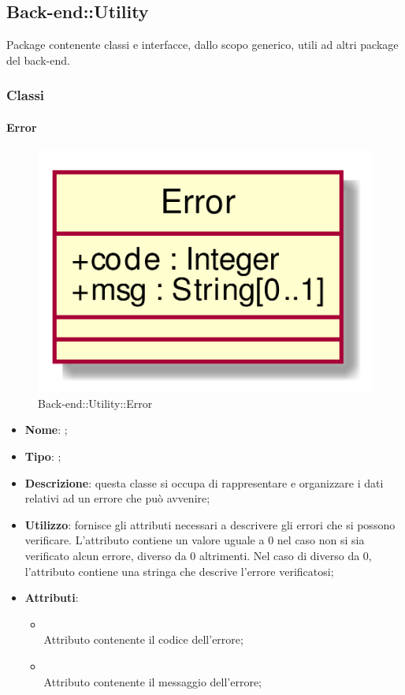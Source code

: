 \FloatBarrier

\subsection{Back-end::Utility}
Package contenente classi e interfacce, dallo scopo generico, utili ad altri package del back-end.
\subsubsection{Classi}
\hypertarget{Error_label}{\paragraph{Error}}
\begin{figure}[h]
	\centering
	\includegraphics[width=\textwidth,height=\textheight,keepaspectratio]{images/ClassError.png}
	\caption{Back-end::Utility::Error}
\end{figure}
\begin{itemize}
	\item \textbf{Nome}: ;
	\item \textbf{Tipo}: ;
	\item \textbf{Descrizione}: questa classe si occupa di rappresentare e organizzare i dati relativi ad un errore che può avvenire;
	\item \textbf{Utilizzo}: fornisce gli attributi necessari a descrivere gli errori che si possono verificare.
L'attributo  contiene un valore uguale a 0 nel caso non si sia verificato alcun errore, diverso da 0 altrimenti.
Nel caso di  diverso da 0, l'attributo  contiene una stringa che descrive l'errore verificatosi;
	\item \textbf{Attributi}:
	\begin{itemize}
		\item[]  \\
		Attributo contenente il codice dell'errore;
		\item[]  \\
		Attributo contenente il messaggio dell'errore;
	\end{itemize}
\end{itemize}
\FloatBarrier

